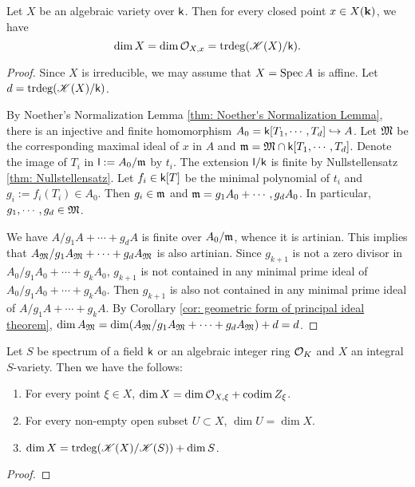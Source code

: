     \begin{lemma}\label{lem: dimension of algebraic varieties}
        Let $X$ be an algebraic variety over ${\mathsf{k}}$.
        Then for every closed point $x \in X({\mathbf{k}})$, we have 
        \[ \dim X = \dim {\mathcal{O}}_{X,x} = \operatorname{trdeg}({\mathscr{K}}(X)/{\mathsf{k}}). \] 
    \end{lemma}
    \begin{proof}
        Since $X$ is irreducible, we may assume that $X = \operatorname{Spec} A$ is affine.
        Let $d = \operatorname{trdeg}({\mathscr{K}}(X)/{\mathsf{k}})$.

        By Noether's Normalization Lemma \ref{thm: Noether's Normalization Lemma}, there is an injective and finite homomorphism $A_0 = {\mathsf{k}}[T_1,\cdots,T_d] \hookrightarrow A$.
        Let ${\mathfrak{M}}$ be the corresponding maximal ideal of $x$ in $A$ and ${\mathfrak{m}} = {\mathfrak{M}} \cap {\mathsf{k}}[T_1,\cdots,T_d]$.
        Denote the image of $T_i$ in ${\mathsf{l}}:=A_0/{\mathfrak{m}}$ by $t_i$.
        The extension ${\mathsf{l}}/{\mathsf{k}}$ is finite by Nullstellensatz \ref{thm: Nullstellensatz}.
        Let $f_i\in {\mathsf{k}}[T]$ be the minimal polynomial of $t_i$ and $g_i:= f_i(T_i) \in A_0$.
        Then $g_i \in {\mathfrak{m}}$ and ${\mathfrak{m}} = g_1A_0 +\cdots,g_d A_0$.
        In particular, $g_1,\cdots,g_d \in {\mathfrak{M}}$.

        We have $A/g_1A+\cdots+g_dA$ is finite over $A_0/{\mathfrak{m}}$, whence it is artinian.
        This implies that $A_{\mathfrak{M}}/g_1A_{\mathfrak{M}} + \cdots + g_dA_{\mathfrak{M}}$ is also artinian.
        Since $g_{k+1}$ is not a zero divisor in $A_0/g_1A_0+\cdots+g_kA_0$, $g_{k+1}$ is not contained in any minimal prime ideal of $A_0/g_1A_0+\cdots+g_kA_0$.
        Then $g_{k+1}$ is also not contained in any minimal prime ideal of $A/g_1A+\cdots+g_kA$.
        By Corollary \ref{cor: geometric form of principal ideal theorem}, $\dim A_{\mathfrak{M}} = \dim (A_{\mathfrak{M}}/g_1A_{\mathfrak{M}} + \cdots + g_dA_{\mathfrak{M}}) + d = d$.
    \end{proof}

    \begin{theorem}\label{thm: dimension of varieties}
        Let $S$ be spectrum of a field ${\mathsf{k}}$ or an algebraic integer ring ${\mathcal{O}}_K$ and $X$ an integral $S$-variety.
        Then we have the follows:
        \begin{enumerate}[label=(\roman*)]
            \item For every point $\xi \in X$, $\dim X = \dim {\mathcal{O}}_{X,\xi} + \operatorname{codim} Z_\xi$.
            \item For every non-empty open subset $U \subset X$, $\dim U = \dim X$.
            \item $\dim X = \operatorname{trdeg}({\mathscr{K}}(X)/{\mathscr{K}}(S)) + \dim S$.
        \end{enumerate}
    \end{theorem}
    \begin{proof}
    \end{proof}

